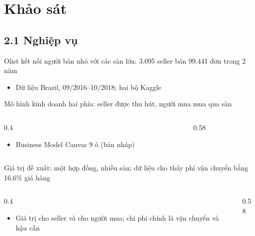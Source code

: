 \section[Khảo sát]{Khảo sát}

\subsection{2.1 Nghiệp vụ}

\begin{frame}{Olist kết nối người bán nhỏ với các sàn lớn: 3.095 seller bán 99.441 đơn trong 2 năm}
\begin{itemize}
  \item Dữ liệu Brazil, 09/2016–10/2018; hai bộ Kaggle
\end{itemize}
\canxacnhan
{}
\end{frame}

\begin{frame}{Mô hình kinh doanh hai phía: seller được thu hút, người mua mua qua sàn}
\begin{columns}[T]\begin{column}{0.4\textwidth}
\begin{itemize}
  \item Business Model Canvas 9 ô (bản nháp)
\end{itemize}
\end{column}\begin{column}{0.58\textwidth}
\begin{center}\end{center}
\end{column}\end{columns}
\canxacnhan
{}
\end{frame}

\begin{frame}{Giá trị đề xuất: một hợp đồng, nhiều sàn; dữ liệu cho thấy phí vận chuyển bằng 16,6\% giá hàng}
\begin{columns}[T]\begin{column}{0.4\textwidth}
\begin{itemize}
  \item Giá trị cho seller và cho người mua; chi phí chính là vận chuyển và hậu cần
\end{itemize}
\end{column}\begin{column}{0.58\textwidth}
\begin{center}\end{center}
\end{column}\end{columns}

\end{frame}

